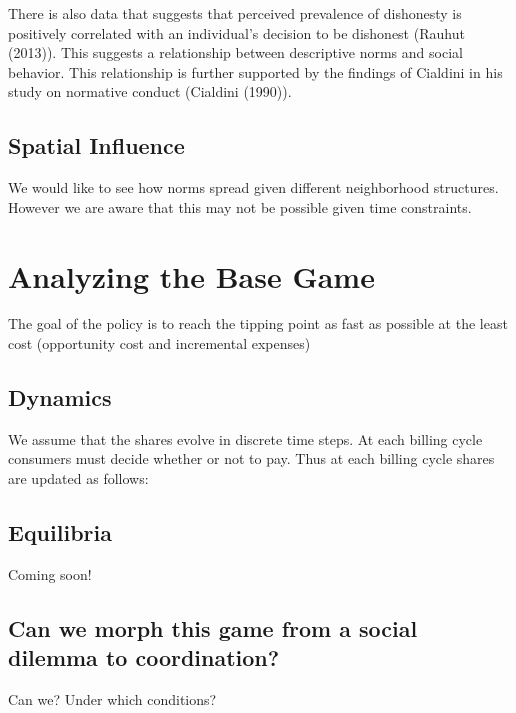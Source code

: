 \documentclass{article}
\begin{document}
There is also data that suggests that perceived prevalence of dishonesty is positively correlated with an individual's decision to be dishonest (Rauhut (2013)). This suggests a relationship between descriptive norms and social behavior. This relationship is further supported by the findings of Cialdini in his study on normative conduct (Cialdini (1990)).

\subsection{Spatial Influence}  
We would like to see how norms spread given different neighborhood structures. However we are aware that this may not be possible given time constraints. 
\section{Analyzing the Base Game}                                                                                                  
The goal of the policy is to reach the tipping point as fast as possible at the least cost (opportunity cost and incremental expenses)

\subsection{Dynamics}
We assume that the shares evolve in discrete time steps. At each billing cycle consumers must decide whether or not to pay. Thus at each billing cycle shares are updated as follows: 

\subsection{Equilibria}
Coming soon!
\subsection{Can we morph this game from a social dilemma to coordination?}
Can we? Under which conditions?
\end{document}
